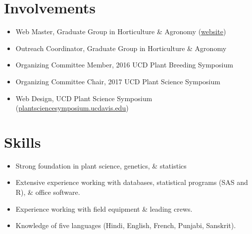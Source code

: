 ﻿\documentclass[a4paper]{article}
\begin{document}
\section*{Involvements}
\begin{itemize}[noitemsep,topsep=0pt]
\item{Web Master, Graduate Group in Horticulture \& Agronomy (\href{http://hortaggradstudents.ucdavis.edu}{website})}
\item{Outreach Coordinator, Graduate Group in Horticulture \& Agronomy}
\item{Organizing Committee Member, 2016 UCD Plant Breeding Symposium}
\item{Organizing Committee Chair, 2017 UCD Plant Science Symposium}
\item{Web Design, UCD Plant Science Symposium (\href{http://plantsciencesymposium.ucdavis.edu}{plantsciencesymposium.ucdavis.edu})}
\end{itemize}

\section*{Skills}
\begin{itemize}[noitemsep,topsep=0pt]
\item{Strong foundation in plant science, genetics, \& statistics}
\item{Extensive experience working with databases, statistical programs (SAS and R), \& office software.}
\item{Experience working with field equipment \& leading crews.}
\item{Knowledge of five languages (Hindi, English, French, Punjabi, Sanskrit).}
\end{itemize}
\end{document}
